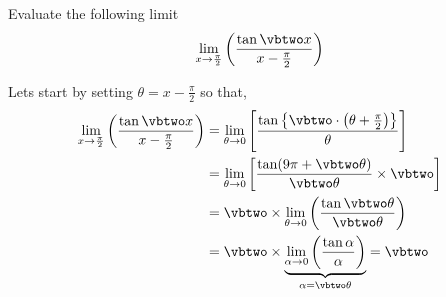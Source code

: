

\MULTIPLY{}\vbtwo

\question[4] Evaluate the following limit \[ \lim_{x\to\frac\pi{2}}\left(\dfrac{\tan\vbtwo x}{x-\frac{\pi}{2}}\right)\]

\begin{solution}[\halfpage]
  Lets start by setting $\theta = x - \frac{\pi}{2}$ so that,
  \begin{align}
    \lim_{x\to\frac\pi{2}}\left( \dfrac{\tan\vbtwo x}{x-\frac\pi{2}}\right) &= 
    \lim_{\theta\to 0}\left[ 
    \dfrac{\tan\left\lbrace\vbtwo\cdot\left( \theta + \frac\pi{2} \right)\right\rbrace}{\theta}
    \right] \\
    &= \lim_{\theta\to 0}\left[ \dfrac{\tan (\vbone\pi + \vbtwo\theta)}{\vbtwo\theta} \times\vbtwo\right] \\
    &= \vbtwo\times\lim_{\theta\to 0}\left( 
    \dfrac{\tan\vbtwo\theta}{\vbtwo\theta}\right) \\
    &= \vbtwo\times\underbrace{\lim_{\alpha\to 0}\left( \dfrac{\tan\alpha}{\alpha}\right)}_{\alpha=\vbtwo\theta} = \vbtwo
  \end{align}

\end{solution}
